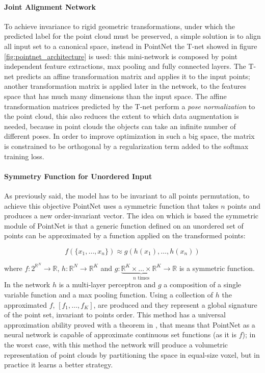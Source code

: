 \paragraph{Joint Alignment Network}

To achieve invariance to rigid geometric transformations, under which the predicted label for the point cloud must be preserved, a simple solution is to align all input set to a canonical space, instead in PointNet the T-net showed in figure \ref{fig:pointnet_architecture} is used: this mini-network is composed by point independent feature extractions, max pooling and fully connected layers. The T-net predicts an affine transformation matrix and applies it to the input points; another transformation matrix is applied later in the network, to the features space that has much many dimensions than the input space. The affine transformation matrices predicted by the T-net perform a \textit{pose normalization} to the point cloud, this also reduces the extent to which data augmentation is needed, because in point clouds the objects can take an infinite number of different poses. In order to improve optimization in such a big space, the matrix is constrained to be orthogonal by a regularization term added to the softmax training loss.

\paragraph{Symmetry Function for Unordered Input}

As previously said, the model has to be invariant to all points permutation, to achieve this objective PointNet uses a symmetric function that takes $n$ points and produces a new order-invariant vector. The idea on which is based the symmetric module of PointNet is that a generic function defined on an unordered set of points can be approximated by a function applied on the transformed points:

\[f(\{x_1, \dots ,x_n\}) \approx g(h(x_1), \dots , h(x_n))\]

where $f : 2^{\mathbb{R}^N} \to \mathbb{R}$, $h: \mathbb{R}^N \to \mathbb{R}^K$ and $g: \underbrace{\mathbb{R}^K \times \dots \times \mathbb{R}^K}_{n \text{ times}} \to \mathbb{R}$ is a symmetric function. In the network $h$ is a multi-layer perceptron and $g$ a composition of a single variable function and a max pooling function. Using a collection of $h$ the approximated $f$, $[f_1, \dots, f_K]$, are produced and they represent a global signature of the point set, invariant to points order. This method has a universal approximation ability proved with a theorem in \cite{qi2017pointnet}, that means that PointNet as a neural network is capable of approximate continuous set functions (as it is $f$); in the worst case, with this method the network will produce a volumetric representation of point clouds by partitioning the space in equal-size voxel, but in practice it learns a better strategy.

